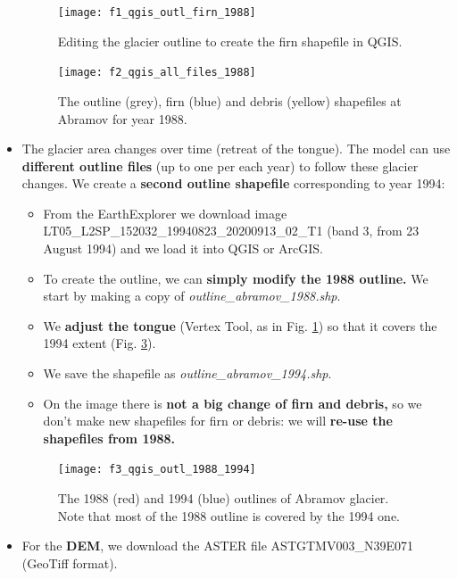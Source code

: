 \documentclass[15pt]{extarticle}
\begin{document}
\begin{itemize}
\begin{figure}[htp!]
    \centering
    \texttt{[image: f1\_qgis\_outl\_firn\_1988]}
    \caption{Editing the glacier outline to create the firn shapefile in QGIS.}
    \label{fig:f1_qgis_outl_firn_1988}
\end{figure}

\begin{figure}[hbp!]
    \centering
    \texttt{[image: f2\_qgis\_all\_files\_1988]}
    \caption{The outline (grey), firn (blue) and debris (yellow) shapefiles at Abramov for year 1988.}
    \label{fig:f2_qgis_all_files_1988}
\end{figure}
 
    \item The glacier area changes over time (retreat of the tongue). The model can use \textbf{different outline files} (up to one per each year) to follow these glacier changes. We create a \textbf{second outline shapefile} corresponding to year 1994:
    \begin{itemize}
        \item From the EarthExplorer we download image LT05\_L2SP\_152032\_19940823\_20200913\_02\_T1 (band 3, from 23 August 1994) and we load it into QGIS or ArcGIS.
         \item To create the outline, we can \textbf{simply modify the 1988 outline.} We start by making a copy of \textit{outline\_abramov\_1988.shp}.
         \item We \textbf{adjust the tongue} (Vertex Tool, as in Fig. \ref{fig:f1_qgis_outl_firn_1988}) so that it covers the 1994 extent (Fig. \ref{fig:f3_qgis_outl_1988_1994}).
         \item We save the shapefile as \textit{outline\_abramov\_1994.shp}.
         \item On the image there is \textbf{not a big change of firn and debris,} so we don't make new shapefiles for firn or debris: we will \textbf{re-use the shapefiles from 1988.}
    \end{itemize}

\begin{figure}[ht]
    \centering
    \texttt{[image: f3\_qgis\_outl\_1988\_1994]}
    \caption{The 1988 (red) and 1994 (blue) outlines of Abramov glacier. Note that most of the 1988 outline is covered by the 1994 one.}
    \label{fig:f3_qgis_outl_1988_1994}
\end{figure}

    \item For the \textbf{DEM}, we download the ASTER file ASTGTMV003\_N39E071 (GeoTiff format).
    

\end{itemize}
\end{document}
